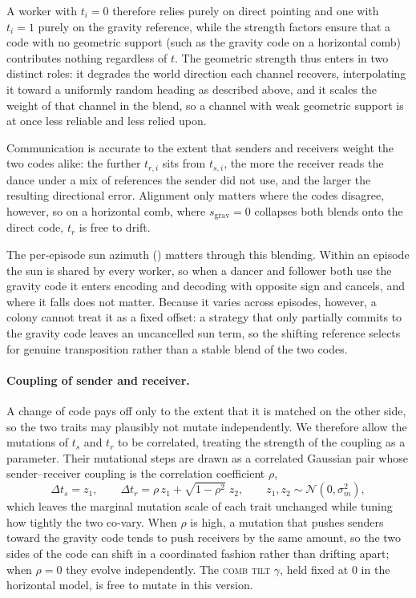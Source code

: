\documentclass[11pt]{article}
\newcommand{\trait}[1]{\textsc{#1}}
\begin{document}
A worker with $t_i = 0$ therefore relies purely on direct pointing and one with
$t_i = 1$ purely on the gravity reference, while the strength factors ensure that
a code with no geometric support (such as the gravity code on a horizontal comb)
contributes nothing regardless of $t$. The geometric strength thus enters in two
distinct roles: it degrades the world direction each channel recovers,
interpolating it toward a uniformly random heading as described above, and it
scales the weight of that channel in the blend, so a channel with weak geometric
support is at once less reliable and less relied upon.

Communication is accurate to the extent that senders and receivers weight the two
codes alike: the further $t_{r,i}$ sits from $t_{s,i}$, the more the receiver
reads the dance under a mix of references the sender did not use, and the larger
the resulting directional error. Alignment only matters where the codes disagree,
however, so on a horizontal comb, where $s_{\mathrm{grav}} = 0$ collapses both
blends onto the direct code, $t_r$ is free to drift.

The per-episode sun azimuth () matters through this
blending. Within an episode the sun is shared by every worker, so when a dancer
and follower both use the gravity code it enters encoding and decoding with
opposite sign and cancels, and where it falls does not matter. Because it varies
across episodes, however, a colony cannot treat it as a fixed offset: a strategy
that only partially commits to the gravity code leaves an uncancelled sun term,
so the shifting reference selects for genuine transposition rather than a stable
blend of the two codes.

\paragraph{Coupling of sender and receiver.}
A change of code pays off only to the extent that it is matched on the other
side, so the two traits may plausibly not mutate independently. We therefore
allow the mutations of $t_s$ and $t_r$ to be correlated, treating the strength of
the coupling as a parameter. Their mutational steps are drawn as a
correlated Gaussian pair whose sender--receiver coupling is the
correlation coefficient $\rho$,
\begin{equation}
  \Delta t_s = z_1, \qquad
  \Delta t_r = \rho\,z_1 + \sqrt{1-\rho^2}\;z_2, \qquad
  z_1, z_2 \sim \mathcal{N}(0, \sigma_m^2),
\end{equation}
which leaves the marginal mutation scale of each trait unchanged while tuning how
tightly the two co-vary. When $\rho$ is high, a mutation that pushes senders
toward the gravity code tends to push receivers by the same amount, so the two
sides of the code can shift in a coordinated fashion rather than drifting apart;
when $\rho = 0$ they evolve independently. The \trait{comb tilt} $\gamma$, held fixed at
$0$ in the horizontal model, is free to mutate in this version.
\end{document}
